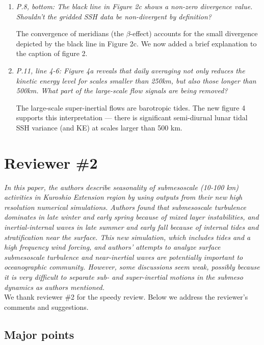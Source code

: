 \documentclass[11pt]{article}
\newcommand{\bdp}{\begin{description}}
\newcommand{\edp}{\end{description}}
\begin{document}
\begin{enumerate}
\item {\it P.8, bottom: The black line in Figure 2c shows a non-zero divergence value.
      Shouldn't the gridded SSH data be non-divergent by definition?}

  \bdp
    The convergence of meridians (the $\beta$-effect) accounts for the
    small divergence depicted by the black line in Figure 2c. We now added
    a brief explanation to the caption of figure 2.
  \edp

\item {\it P.11, line 4-6: Figure 4a reveals that daily averaging not only reduces the
      kinetic energy level for scales smaller than 250km, but also those longer
      than 500km. What part of the large-scale flow signals are being removed?}

  \bdp
  The large-scale super-inertial flows are barotropic tides. The new figure 4
  supports this interpretation --- there is significant semi-diurnal lunar
  tidal SSH variance (and KE) at scales larger than 500 km.
  \edp

\end{enumerate}

%
%

\section{Reviewer \#2}
{\it In this paper, the authors describe seasonality of submesoscale (10-100 km)
activities in Kuroshio Extension region by using outputs from their new high
resolution numerical simulations. Authors found that submesoscale turbulence
dominates in late winter and early spring because of mixed layer instabilities, and
inertial-internal waves in late summer and early fall because of internal tides and
stratification near the surface. This new simulation, which includes tides and a high
frequency wind forcing, and authors' attempts to analyze surface submesoscale
turbulence and near-inertial waves are potentially important to oceanographic
community. However, some discussions seem weak, possibly because it is very
difficult to separate sub- and super-inertial motions in the submeso dynamics as
authors mentioned.}\\

We thank reviewer \#2 for the speedy review. Below we address the reviewer’s
comments and suggestions.

\subsection{Major points}
\end{document}
